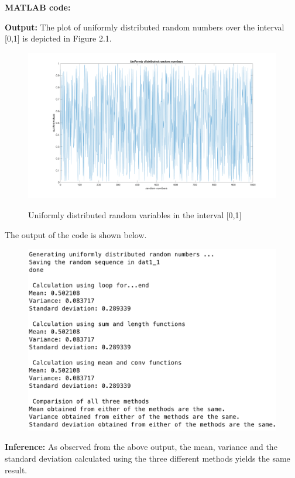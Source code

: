 \noindent \textbf{MATLAB code:}


\noindent \textbf{Output:}
\noindent The plot of uniformly distributed random numbers over the interval [0,1] is depicted in Figure 2.1.
\begin{figure}[H]
\centering
{\includegraphics[scale=0.12]{ass1_1.png}}
\caption{Uniformly distributed random variables in the interval [0,1]}
\end{figure}
\noindent The output of the code is shown below.
\begin{figure}[H]
\centering
{\includegraphics[scale=0.55]{ass1_2.png}}
\end{figure}
\noindent \textbf{Inference:} As observed from the above output, the mean, variance and the standard deviation calculated using the three different methods yields the same result.


